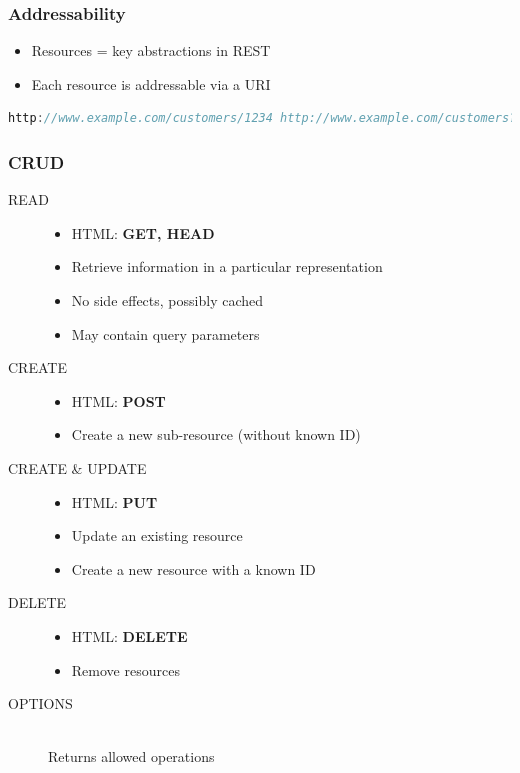 \documentclass[10pt]{article}
\begin{document}
\subsubsection{Addressability}
\begin{itemize}
	\item Resources = key abstractions in REST
	\item Each resource is addressable via a URI
\end{itemize}
\begin{lstlisting}[language=Java, caption=REST example, style=JavaStyle]
http://www.example.com/customers/1234 http://www.example.com/customers?lastName=Meier http://www.example.com/orders/2011/03/445245 http://www.example.com/products/ http://www.example.com/products/4711
\end{lstlisting}
\subsubsection{CRUD}
\begin{description}
	\item[READ] \hfill
	\begin{itemize}
		\item HTML: \textbf{GET, HEAD}
		\item Retrieve information in a particular representation
		\item No side effects, possibly cached
		\item May contain query parameters
	\end{itemize}
	\item[CREATE] \hfill
	\begin{itemize}
		\item HTML: \textbf{POST}
		\item Create a new sub-resource (without known ID)
	\end{itemize}
	\item[CREATE \& UPDATE] \hfill
	\begin{itemize}
		\item HTML: \textbf{PUT}
		\item Update an existing resource
		\item Create a new resource with a known ID
	\end{itemize}
	\item[DELETE] \hfill
	\begin{itemize}
		\item HTML: \textbf{DELETE}
		\item Remove resources
	\end{itemize}
	\item[OPTIONS] \hfill \\
	Returns allowed operations
\end{description}
\end{document}
